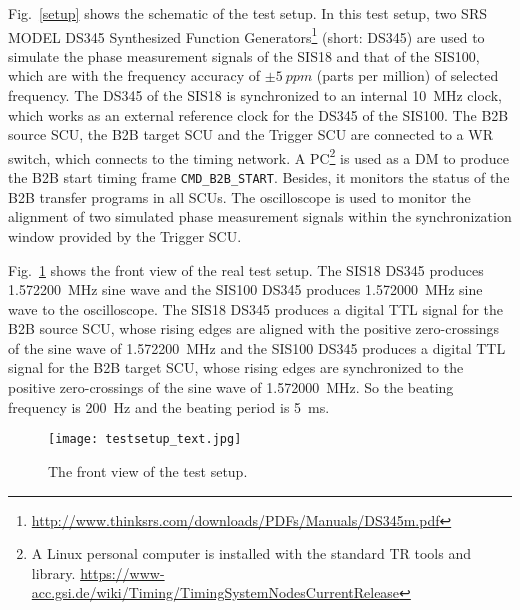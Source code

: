 Fig.~\ref{setup} shows the schematic of the test setup. In this test setup, two SRS MODEL DS345 Synthesized Function Generators\footnote{\url{http://www.thinksrs.com/downloads/PDFs/Manuals/DS345m.pdf}} (short: DS345) are used to simulate the phase measurement signals of the SIS18 and that of the SIS100, which are with the frequency accuracy of $\pm\SI{5}{ppm}$ (parts per million) of selected frequency. The DS345 of the SIS18 is synchronized to an internal \SI{10}{\MHz} clock, which works as an external reference clock for the DS345 of the SIS100. The B2B source SCU, the B2B target SCU and the Trigger SCU are connected to a WR switch, which connects to the timing network. A \gls{PC}\footnote{A Linux personal computer is installed with the standard TR tools and library. \newline\url{https://www-acc.gsi.de/wiki/Timing/TimingSystemNodesCurrentRelease}} is used as a DM to produce the B2B start timing frame \verb|CMD_B2B_START|. Besides, it monitors the status of the B2B transfer programs in all SCUs. The oscilloscope is used to monitor the alignment of two simulated phase measurement signals within the synchronization window provided by the Trigger SCU.   

Fig.~\ref{testsetup_text} shows the front view of the real test setup. The SIS18 DS345 produces \SI{1.572200}{\MHz} sine wave and the SIS100 DS345 produces \SI{1.572000}{\MHz} sine wave to the oscilloscope. The SIS18 DS345 produces a digital TTL signal for the B2B source SCU, whose rising edges are aligned with the positive zero-crossings of the sine wave of \SI{1.572200}{\MHz} and the SIS100 DS345 produces a digital TTL signal for the B2B target SCU, whose rising edges are synchronized to the positive zero-crossings of the sine wave of \SI{1.572000}{\MHz}. So the beating frequency is \SI{200}{\Hz} and the beating period is \SI{5}{\ms}. 
\begin{figure}[!htb]
   \centering   
   \texttt{[image: testsetup\_text.jpg]}
   \caption{The front view of the test setup.}
   \label{testsetup_text}
\end{figure}


